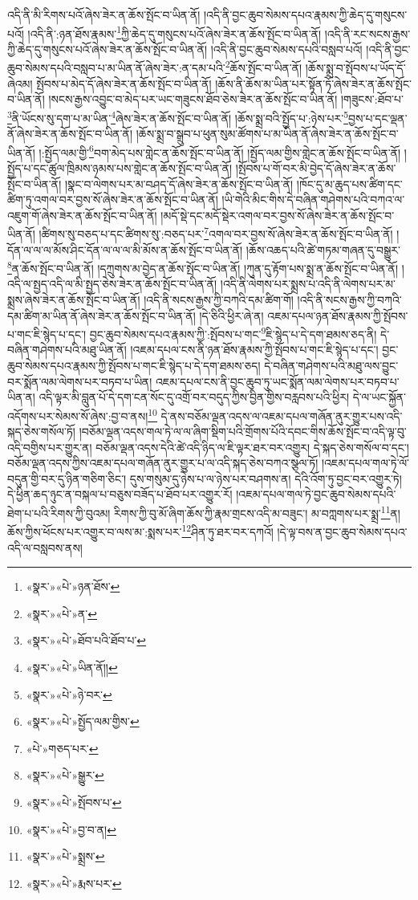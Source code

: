 འདི་ནི་མི་རིགས་པའོ་ཞེས་ཟེར་ན་ཆོས་སྤོང་བ་ཡིན་ནོ། །འདི་ནི་བྱང་ཆུབ་སེམས་དཔའ་རྣམས་ཀྱི་ཆེད་དུ་གསུངས་པའོ། །འདི་ནི་:ཉན་ཐོས་རྣམས་\footnote{«སྣར་»«པེ་»ཉན་ཐོས་}ཀྱི་ཆེད་དུ་གསུངས་པའོ་ཞེས་ཟེར་ན་ཆོས་སྤོང་བ་ཡིན་ནོ། །འདི་ནི་རང་སངས་རྒྱས་ཀྱི་ཆེད་དུ་གསུངས་པའོ་ཞེས་ཟེར་ན་ཆོས་སྤོང་བ་ཡིན་ནོ། །འདི་ནི་བྱང་ཆུབ་སེམས་དཔའི་བསླབ་པའོ། །འདི་ནི་བྱང་ཆུབ་སེམས་དཔའི་བསླབ་པ་མ་ཡིན་ནོ་ཞེས་ཟེར་:ན་དམ་པའི་\footnote{«སྣར་»«པེ་»ན་}ཆོས་སྤོང་བ་ཡིན་ནོ། །ཆོས་སྨྲ་བ་སྤོབས་པ་ཡོད་དོ་ཞེའམ། སྤོབས་པ་མེད་དོ་ཞེས་ཟེར་ན་ཆོས་སྤོང་བ་ཡིན་ནོ། །ཆོས་ནི་ཆོས་མ་ཡིན་པར་སྟོན་ཏོ་ཞེས་ཟེར་ན་ཆོས་སྤོང་བ་ཡིན་ནོ། །སངས་རྒྱས་འབྱུང་བ་མེད་པར་ཡང་གཟུངས་ཐོབ་ཅེས་ཟེར་ན་ཆོས་སྤོང་བ་ཡིན་ནོ། །གཟུངས་:ཐོབ་པ་\footnote{«སྣར་»«པེ་»ཐོབ་པའི་ཐོབ་པ་}ནི་ཡོངས་སུ་དག་པ་མ་ཡིན་\footnote{«སྣར་»«པེ་»ཡིན་ནོ།།}ཞེས་ཟེར་ན་ཆོས་སྤོང་བ་ཡིན་ནོ། །ཆོས་སྨྲ་བའི་སྤྱོད་པ་:ཉེས་པར་\footnote{«སྣར་»«པེ་»ཉེ་བར་}བྱས་པ་དང་ལྡན་ནོ་ཞེས་ཟེར་ན་ཆོས་སྤོང་བ་ཡིན་ནོ། །ཆོས་སྨྲ་བ་སྒྲུབ་པ་ཕུན་སུམ་ཚོགས་པ་མ་ཡིན་ནོ་ཞེས་ཟེར་ན་ཆོས་སྤོང་བ་ཡིན་ནོ། །:སྤྱོད་ལམ་གྱི་\footnote{«སྣར་»«པེ་»སྤྱོད་ལམ་གྱིས་}བག་མེད་པས་གླེང་ན་ཆོས་སྤོང་བ་ཡིན་ནོ། །སྤྱོད་ལམ་གྱིས་གླེང་ན་ཆོས་སྤོང་བ་ཡིན་ནོ། །སྤྱོད་པ་དང་ཚུལ་ཁྲིམས་ཉམས་པས་གླེང་ན་ཆོས་སྤོང་བ་ཡིན་ནོ། །སྤོབས་པ་གོ་བར་མི་བྱེད་དོ་ཞེས་ཟེར་ན་ཆོས་སྤོང་བ་ཡིན་ནོ། །སྣང་བ་ལེགས་པར་མ་བཤད་དོ་ཞེས་ཟེར་ན་ཆོས་སྤོང་བ་ཡིན་ནོ། །ཁོང་དུ་མ་ཆུད་པས་ཚིག་དང་ཚིག་ཏུ་འགལ་བར་བྱས་སོ་ཞེས་ཟེར་ན་ཆོས་སྤོང་བ་ཡིན་ནོ། །ཡི་གེའི་མིང་གིས་དེ་བཞིན་གཤེགས་པའི་བཀའ་ལ་འཇུག་གོ་ཞེས་ཟེར་ན་ཆོས་སྤོང་བ་ཡིན་ནོ། །མདོ་སྡེ་དང་མདོ་སྡེར་འགལ་བར་བྱས་སོ་ཞེས་ཟེར་ན་ཆོས་སྤོང་བ་ཡིན་ནོ། །ཚིགས་སུ་བཅད་པ་དང་ཚིགས་སུ་:བཅད་པར་\footnote{«པེ་»གཅད་པར་}འགལ་བར་བྱས་སོ་ཞེས་ཟེར་ན་ཆོས་སྤོང་བ་ཡིན་ནོ། །དོན་ལ་ལ་ལ་མོས་ཤིང་དོན་ལ་ལ་ལ་མི་མོས་ན་ཆོས་སྤོང་བ་ཡིན་ནོ། །ཆོས་འཆད་པའི་ཚེ་གཏམ་གཞན་དུ་བསྒྱུར་\footnote{«སྣར་»«པེ་»སྒྱུར་}ན་ཆོས་སྤོང་བ་ཡིན་ནོ། །དཀྲུགས་མ་བྱེད་ན་ཆོས་སྤོང་བ་ཡིན་ནོ། །ཀུན་དུ་རྟོག་པས་སྨྲ་ན་ཆོས་སྤོང་བ་ཡིན་ནོ། །འདི་ལ་སྤྱད་འདི་ལ་མི་སྤྱད་ཅེས་ཟེར་ན་ཆོས་སྤོང་བ་ཡིན་ནོ། །འདི་ནི་ལེགས་པར་སྨྲས་པ་འདི་ནི་ལེགས་པར་མ་སྨྲས་ཞེས་ཟེར་ན་ཆོས་སྤོང་བ་ཡིན་ནོ། །འདི་ནི་སངས་རྒྱས་ཀྱི་བཀའི་དམ་ཚིག་གོ། །འདི་ནི་སངས་རྒྱས་ཀྱི་བཀའི་དམ་ཚིག་མ་ཡིན་ནོ་ཞེས་ཟེར་ན་ཆོས་སྤོང་བ་ཡིན་ནོ། །དེ་ཅིའི་ཕྱིར་ཞེ་ན། འཇམ་དཔལ་ཉན་ཐོས་རྣམས་ཀྱི་སྤོབས་པ་གང་ཇི་སྙེད་པ་དང་། བྱང་ཆུབ་སེམས་དཔའ་རྣམས་ཀྱི་:སྤོབས་པ་གང་\footnote{«སྣར་»«པེ་»སྤོབས་པ་}ཇི་སྙེད་པ་དེ་དག་ཐམས་ཅད་ནི། དེ་བཞིན་གཤེགས་པའི་མཐུ་ཡིན་ནོ། །འཇམ་དཔལ་ངས་ནི་ཉན་ཐོས་རྣམས་ཀྱི་སྤོབས་པ་གང་ཇི་སྙེད་པ་དང་། བྱང་ཆུབ་སེམས་དཔའ་རྣམས་ཀྱི་སྤོབས་པ་གང་ཇི་སྙེད་པ་དེ་དག་ཐམས་ཅད། དེ་བཞིན་གཤེགས་པའི་མཐུ་ལས་བྱུང་བར་སྨོན་ལམ་ལེགས་པར་བཏབ་པ་ཡིན། འཇམ་དཔལ་ངས་ནི་བྱང་ཆུབ་ཏུ་ཡང་སྨོན་ལམ་ལེགས་པར་བཏབ་པ་ཡིན་ན། འདི་ལྟར་མི་བླུན་པོ་དེ་དག་ངན་སོང་དུ་འགྲོ་བར་བདུད་ཀྱིས་བྱིན་གྱིས་བརླབས་པའི་ཕྱིར། དེ་ལ་ཡང་སྐྱོན་འདོགས་པར་སེམས་སོ་ཞེས་:བྱ་བ་ནས།\footnote{«སྣར་»«པེ་»བྱ་བ་ན།} དེ་ནས་བཅོམ་ལྡན་འདས་ལ་འཇམ་དཔལ་གཞོན་ནུར་གྱུར་པས་འདི་སྐད་ཅེས་གསོལ་ཏོ། །བཅོམ་ལྡན་འདས་གལ་ཏེ་ལ་ལ་ཞིག་སྡིག་པའི་གྲོགས་པོའི་དབང་གིས་ཆོས་སྤོང་བ་འདི་ལྟ་བུ་འདི་བགྱིས་པར་གྱུར་ན། བཅོམ་ལྡན་འདས་དེའི་ཚེ་འདི་ཉིད་ལ་ཇི་ལྟར་ཐར་བར་འགྱུར། དེ་སྐད་ཅེས་གསོལ་བ་དང་། བཅོམ་ལྡན་འདས་ཀྱིས་འཇམ་དཔལ་གཞོན་ནུར་གྱུར་པ་ལ་འདི་སྐད་ཅེས་བཀའ་སྩལ་ཏོ། །འཇམ་དཔལ་གལ་ཏེ་ལོ་བདུན་གྱི་བར་དུ་ཉིན་གཅིག་ཅིང་། དུས་གསུམ་དུ་ཉེས་པ་ལ་ཉེས་པར་བཤགས་ན། དེའི་འོག་ཏུ་བྱང་བར་འགྱུར་ཏེ། དེ་ཕྱིན་ཆད་ཉུང་ན་བསྐལ་པ་བཅུས་བཟོད་པ་ཐོབ་པར་འགྱུར་རོ། །འཇམ་དཔལ་གལ་ཏེ་བྱང་ཆུབ་སེམས་དཔའི་ཐེག་པ་པའི་རིགས་ཀྱི་བུའམ། རིགས་ཀྱི་བུ་མོ་ཞིག་ཆོས་ཀྱི་རྣམ་གྲངས་འདི་མ་བཟུང་། མ་བཀླགས་པར་སྨྲ་\footnote{«སྣར་»«པེ་»སྨྲས་}ན། ཆོས་ཀྱིས་ཕོངས་པར་འགྱུར་བ་ལས་མ་:སྨས་པར་\footnote{«སྣར་»«པེ་»རྨས་པར་}ཤིན་ཏུ་ཐར་བར་དཀའོ། །དེ་ལྟ་བས་ན་བྱང་ཆུབ་སེམས་དཔའ་འདི་ལ་བསླབས་ནས། 